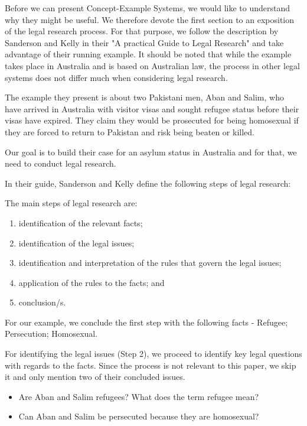 Before we can present Concept-Example Systems, we would like to understand why they might be useful. We therefore devote the first section to an exposition of the legal research process. For that purpose, we follow the description by Sanderson and Kelly in their "A practical Guide to Legal Research" \cite{sanderson2021practical} and take advantage of their running example. It should be noted that while the example takes place in Australia and is based on Australian law, the process in other legal systems does not differ much when considering legal research.

The example they present is about two Pakistani men, Aban and Salim, who have arrived in Australia with visitor visas and sought refugee status before their visas have expired. They claim they would be prosecuted for being homosexual if they are forced to return to Pakistan and risk being beaten or killed.

Our goal is to build their case for an asylum status in Australia and for that, we need to conduct legal research.

In their guide, Sanderson and Kelly define the following steps of legal research:

\begin{definition}
The main steps of legal research are:
\begin{enumerate}
    \item identification of the relevant facts;
    \item identification of the legal issues;
    \item identification and interpretation of the rules that govern the legal issues;
    \item application of the rules to the facts; and
    \item conclusion/s.
\end{enumerate}
\end{definition}

For our example, we conclude the first step with the following facts - Refugee; Persecution; Homosexual.

For identifying the legal issues (Step 2), we proceed to identify key legal questions with regards to the facts. Since the process is not relevant to this paper, we skip it and only mention two of their concluded issues.

\begin{itemize}
\item Are Aban and Salim refugees? What does the term refugee mean?
\item Can Aban and Salim be persecuted because they are homosexual?
\end{itemize}

